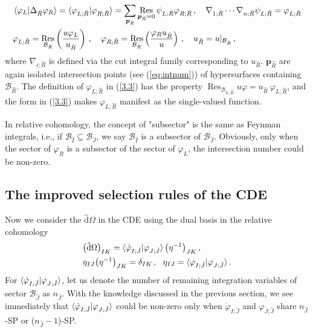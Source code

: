 \documentclass[a4paper,11pt]{article}
\newcommand{\nn}{\nonumber}
\newcommand{\nds}{\hat{\mathrm{d}}}
\def\eref#1{(\ref{#1})}
\DeclareMathOperator{\Res}{Res}
\begin{document}
\begin{align}
&\braket{\varphi_L|\Delta_{\hat{R}}\varphi_R}= \braket{\varphi_{L;\hat{R}}  |\varphi_{R;\hat{R}}} = \sum_{\bm{p}_{\hat{R}}}\Res_{\bm{p}_{\hat{R}}=0} \psi_{L;\hat{R}} \varphi_{R;\hat{R}}   \, , \quad \nabla_{1;\hat{R}} \cdots \nabla_{n;\hat{R}} \psi_{L;\hat{R}} = \varphi_{L;\hat{R}} \nn\\
& \varphi_{L;\hat{R}} = \Res_{\mathcal{B}_{\hat{R}}}  \left( \frac{u\varphi_L}{u_{\hat{R}}}\right)  \, , \quad  \varphi_{R;\hat{R}} = \Res_{\mathcal{B}_{\hat{R}}}  \left( \frac{\varphi_R u_{\hat{R}}}{u} \right)      \, , \quad  u_{\hat{R}}=u|_{\mathcal{B}_{\hat{R}}} \, , ~~~\label{3.3}
\end{align}
where $\nabla_{i;\hat{R}}$  is defined via the cut integral family corresponding to $u_{\hat{R}}$.  $\bm{p}_{\hat{R}}$ are again isolated intersection points (see \eref{eq:intnum}) of hypersurfaces
containing  $\mathcal{B}_{\hat{R}}$. The definition of $\varphi_{L;\hat{R}}$ in \eref{3.3} has the property
$\Res_{\mathcal{B}_{L;\hat{R}}}  u \varphi = u_{\hat{R}} ~ \varphi_{L;\hat{R}}$, and the form in \eref{3.3}
makes $\varphi_{L;\hat{R}}$ manifest as the single-valued function. 







In relative cohomology, the concept of "subsector" is the same as Feynman integrals, i.e., if $\mathcal{B}_{\hat{I}}  \subseteq \mathcal{B}_{\hat{J}} $, we say $\mathcal{B}_{\hat{I}}$ is a subsector of $\mathcal{B}_{\hat{J}}$. Obviously, only when the sector of $\varphi_R$ is a subsector of the sector of $\varphi_L$, the intersection number could be non-zero.




\subsection{The improved selection rules of the CDE}

Now we consider the $\nds \Omega$ in the CDE using the dual basis in the relative cohomology
\begin{align}
    &\big( \nds \Omega \big)_{IK} = \braket{\dot{\varphi}_{I;\hat{J}}|\varphi_{J;\hat{J}}} \big( \eta^{-1} \big)_{JK} \, ,\nn\\
    & \eta_{IJ}\big( \eta^{-1} \big)_{JK} = \delta_{IK}   \, , \ \         \eta_{IJ} = \braket{\varphi_{I;\hat{J}}|\varphi_{J;\hat{J}}} .
    \label{eq:intnumDEc}
\end{align}
For $\braket{\dot{\varphi}_{I;\hat{J}}|\varphi_{J;\hat{J}}}$, let us denote the number of remaining integration variables of sector $\mathcal{B}_{\hat{J}}$ as $n_{\hat{J}}$. With the knowledge discussed in the previous section, we see immediately that  $\braket{\dot{\varphi}_{I;\hat{J}}|\varphi_{J;\hat{J}}}$ could be non-zero only when $\dot{\varphi}_{I;\hat{J}}$ and $\varphi_{J;\hat{J}}$ share $n_{\hat{J}}$-SP or ($n_{\hat{J}}-1$)-SP.
\end{document}
